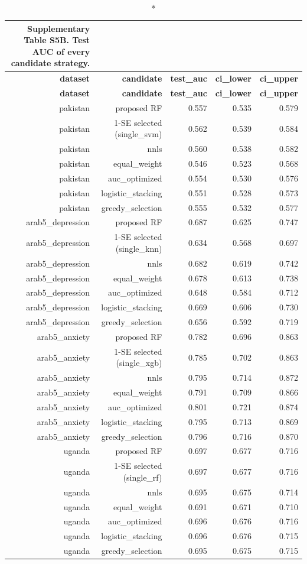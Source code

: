\documentclass[10pt]{article}
\begin{document}
\tiny
\setlength{\tabcolsep}{2pt}
\begin{longtable}{rrrrr}
\caption*{\textbf{Supplementary Table S5B.} Test AUC of every candidate strategy.}\\
\toprule
\textbf{dataset} & \textbf{candidate} & \textbf{test\_auc} & \textbf{ci\_lower} & \textbf{ci\_upper} \\
\midrule
\endfirsthead
\toprule
\textbf{dataset} & \textbf{candidate} & \textbf{test\_auc} & \textbf{ci\_lower} & \textbf{ci\_upper} \\
\midrule
\endhead
\bottomrule
\endfoot
pakistan & proposed RF & 0.557 & 0.535 & 0.579 \\
pakistan & 1-SE selected (single\_svm) & 0.562 & 0.539 & 0.584 \\
pakistan & nnls & 0.560 & 0.538 & 0.582 \\
pakistan & equal\_weight & 0.546 & 0.523 & 0.568 \\
pakistan & auc\_optimized & 0.554 & 0.530 & 0.576 \\
pakistan & logistic\_stacking & 0.551 & 0.528 & 0.573 \\
pakistan & greedy\_selection & 0.555 & 0.532 & 0.577 \\
arab5\_depression & proposed RF & 0.687 & 0.625 & 0.747 \\
arab5\_depression & 1-SE selected (single\_knn) & 0.634 & 0.568 & 0.697 \\
arab5\_depression & nnls & 0.682 & 0.619 & 0.742 \\
arab5\_depression & equal\_weight & 0.678 & 0.613 & 0.738 \\
arab5\_depression & auc\_optimized & 0.648 & 0.584 & 0.712 \\
arab5\_depression & logistic\_stacking & 0.669 & 0.606 & 0.730 \\
arab5\_depression & greedy\_selection & 0.656 & 0.592 & 0.719 \\
arab5\_anxiety & proposed RF & 0.782 & 0.696 & 0.863 \\
arab5\_anxiety & 1-SE selected (single\_xgb) & 0.785 & 0.702 & 0.863 \\
arab5\_anxiety & nnls & 0.795 & 0.714 & 0.872 \\
arab5\_anxiety & equal\_weight & 0.791 & 0.709 & 0.866 \\
arab5\_anxiety & auc\_optimized & 0.801 & 0.721 & 0.874 \\
arab5\_anxiety & logistic\_stacking & 0.795 & 0.713 & 0.869 \\
arab5\_anxiety & greedy\_selection & 0.796 & 0.716 & 0.870 \\
uganda & proposed RF & 0.697 & 0.677 & 0.716 \\
uganda & 1-SE selected (single\_rf) & 0.697 & 0.677 & 0.716 \\
uganda & nnls & 0.695 & 0.675 & 0.714 \\
uganda & equal\_weight & 0.691 & 0.671 & 0.710 \\
uganda & auc\_optimized & 0.696 & 0.676 & 0.716 \\
uganda & logistic\_stacking & 0.696 & 0.676 & 0.715 \\
uganda & greedy\_selection & 0.695 & 0.675 & 0.715 \\
\bottomrule
\end{longtable}
\end{document}
